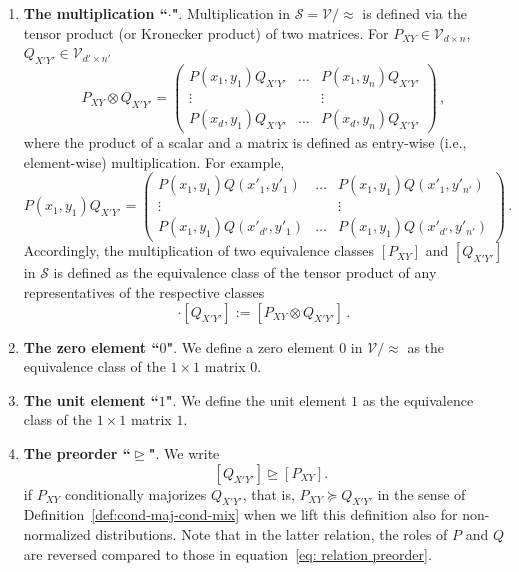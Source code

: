 \documentclass[aps,pra,11pt,onecolumn,nofootinbib,tightenlines]{revtex4-2}
\theoremstyle{definition}
\newcommand{\V}{\mathcal{V}}
\newcommand{\rgeq}{\trianglerighteq}
\begin{document}
\begin{enumerate}
\item \textbf{The multiplication ``$\cdot$"}.
Multiplication in $\mathcal{S} = \mathcal{V}/\!\approx$ is defined via the tensor product (or Kronecker product) of two matrices. For $P_{XY} \in \V_{d \times n}$, $Q_{X'Y'} \in \V_{d' \times n'}$
\begin{equation}
P_{XY} \otimes Q_{X'Y'} = \begin{pmatrix}
P(x_1,y_1)Q_{X'Y'} & \hdots & P(x_1,y_n) Q_{X'Y'} \\
\vdots &  & \vdots \\
P(x_d,y_1) Q_{X'Y'} & \hdots & P(x_d,y_n) Q_{X'Y'}
\end{pmatrix} \,,
\end{equation}
where the product of a scalar and a matrix is defined as entry-wise (i.e., element-wise) multiplication. For example,
\begin{equation}
P(x_1,y_1)Q_{X'Y'} = \begin{pmatrix}
P(x_1,y_1)Q(x'_1,y'_1) & \hdots & P(x_1,y_1) Q(x'_1,y'_{n'}) \\
\vdots &  & \vdots \\
P(x_1,y_1) Q(x'_{d'},y'_1) & \hdots & P(x_1,y_1) Q(x'_{d'},y'_{n'})
\end{pmatrix} \,.
\end{equation}
Accordingly, the multiplication of two equivalence classes $[P_{XY}]$ and $[Q_{X'Y'}]$ in $\mathcal{S}$ is defined as the equivalence class of the tensor product of any representatives of the respective classes
\begin{equation}
    [P_{XY}] \cdot [Q_{X'Y'}] := [P_{XY} \otimes Q_{X'Y'}] \,.
\end{equation}

\item \textbf{The zero element ``$0$"}. We define a zero element $0$ in $\V/\!\approx$ as the equivalence class of the $1\times 1$ matrix $0$.

\item \textbf{The unit element ``$1$"}.  We define the unit element $1$ as the equivalence class of the $1\times 1$ matrix $1$.

\item \textbf{The preorder ``$\rgeq$"}.
\label{item: preorder}
We write
\begin{equation}
\label{eq: relation preorder}
\quad[Q_{X'Y'}]\rgeq[P_{XY}].
\end{equation}
if $P_{XY}$ conditionally majorizes $Q_{X'Y'}$, that is, $P_{XY} \succeq Q_{X'Y'}$ in the sense of Definition~\ref{def:cond-maj-cond-mix} when we lift this definition also for non-normalized distributions. Note that in the latter relation, the roles of $P$ and $Q$ are reversed compared to those in equation~\eqref{eq: relation preorder}.
\end{enumerate}
\end{document}
